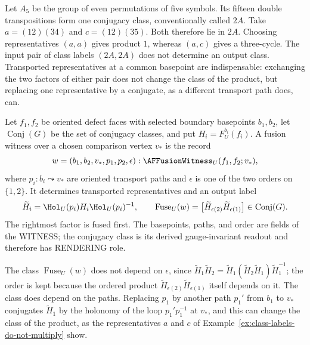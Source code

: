 \begin{example}
\label{ex:class-labels-do-not-multiply}
Let $A_5$ be the group of even permutations of five symbols.  Its fifteen
double transpositions form one conjugacy class, conventionally called $2A$.
Take $a=(12)(34)$ and $c=(12)(35)$.  Both therefore lie in $2A$.  Choosing
representatives $(a,a)$ gives product $1$, whereas $(a,c)$ gives a
three-cycle.  The input pair of class labels $(2A,2A)$ does not determine an
output class.  Transported representatives at a common basepoint are
indispensable: exchanging the two factors of either pair does not change the
class of the product, but replacing one representative by a conjugate, as a
different transport path does, can.
\end{example}

\begin{definition}
\label{def:defect-fusion-witness}
Let $f_1,f_2$ be oriented defect faces with selected boundary basepoints
$b_1,b_2$, let $\operatorname{Conj}(G)$ be the set of conjugacy classes, and
put $H_i=F_U^{b_i}(f_i)$.  A fusion witness over a chosen
comparison vertex $v_*$ is the record
\[
 w=(b_1,b_2,v_*,p_1,p_2,\epsilon):
   \AFFusionWitness_U(f_1,f_2;v_*),
\]
where $p_i:b_i\leadsto v_*$ are oriented transport paths and
$\epsilon$ is one of the two orders on $\{1,2\}$.  It determines transported
representatives and an output label
\[
 \widetilde H_i
 =\Hol_U(p_i)H_i\Hol_U(p_i)^{-1},
 \qquad
 \operatorname{Fuse}_U(w)
 =\bigl[\widetilde H_{\epsilon(2)}
         \widetilde H_{\epsilon(1)}\bigr]
 \in\operatorname{Conj}(G).
\]
The rightmost factor is fused first.  The basepoints, paths, and order are
fields of the WITNESS; the conjugacy class is its derived gauge-invariant
readout and therefore has RENDERING role.
\end{definition}

The class $\operatorname{Fuse}_U(w)$ does not depend on $\epsilon$, since
$\widetilde H_1\widetilde H_2
 =\widetilde H_1(\widetilde H_2\widetilde H_1)\widetilde H_1^{-1}$; the order
is kept because the ordered product
$\widetilde H_{\epsilon(2)}\widetilde H_{\epsilon(1)}$ itself depends on it.
The class does depend on the paths.  Replacing $p_1$ by another path $p_1'$
from $b_1$ to $v_*$ conjugates $\widetilde H_1$ by the holonomy of the loop
$p_1'p_1^{-1}$ at $v_*$, and this can change the class of the product, as the
representatives $a$ and $c$ of Example~\ref{ex:class-labels-do-not-multiply}
show.

